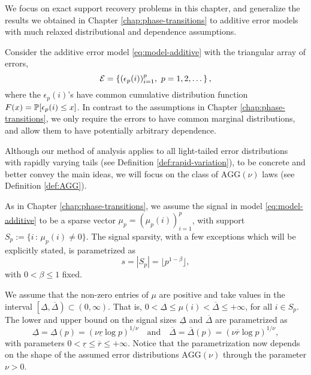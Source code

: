 
We focus on exact support recovery problems in this chapter, and generalize the results we obtained in Chapter \ref{chap:phase-transitions} to additive error models with much relaxed distributional and dependence assumptions.

Consider the additive error model \eqref{eq:model-additive} with the triangular array of errors,
\begin{equation} \label{eq:error-array}
    {\cal E} = \left\{ (\epsilon_p(i))_{i=1}^p,\ p=1,2,\dots\right\},
\end{equation}
where the $\epsilon_p(i)$'s have common cumulative distribution function $F(x)=\P[\epsilon_p(i)\le x]$.
In contrast to the assumptions in Chapter \ref{chap:phase-transitions}, we only require the errors to have common marginal distributions, and allow them to have potentially arbitrary dependence.

Although our method of analysis applies to all light-tailed error distributions with rapidly varying tails (see Definition \ref{def:rapid-variation}), to be concrete and better convey the main ideas, we will focus on the class of $\mathrm{AGG}(\nu)$ laws (see Definition \ref{def:AGG}).

As in Chapter \ref{chap:phase-transitions}, we assume the signal in model \eqref{eq:model-additive} to be a sparse vector $\mu_p = \left(\mu_p(i)\right)_{i=1}^p$, with support
$
S_p:= \{ i\, :\, \mu_p(i)\not = 0\}.
$ 
The signal sparsity, with a few exceptions which will be explicitly stated, is parametrized as
\begin{equation} \label{eq:sparsity-parametrized}
    s = |S_p| = \lfloor p^{1 -\beta} \rfloor, %
\end{equation}
with $0 < \beta \le 1$ fixed.

We assume that the non-zero entries of $\mu$ are positive and take values in the interval $\left[\underline{\Delta},\overline{\Delta}\right)\subset (0,\infty)$.
That is, $0<\underline{\Delta}\le\mu(i)<\overline{\Delta}\le+\infty$, for all $i\in S_p$.
The lower and upper bound on the signal sizes $\underline{\Delta}$ and $\overline{\Delta}$ are parametrized as
\begin{equation} \label{eq:signal-size-parametrized}
    \underline{\Delta} = \underline{\Delta}(p) = (\nu \underline{r} \log{p})^{1/\nu} \quad \text{and} \quad
    \overline{\Delta} = \overline{\Delta}(p)  = (\nu \overline{r} \log{p})^{1/\nu},
\end{equation}
with parameters $0 < \underline{r} \le \overline{r} \le +\infty$.
Notice that the parametrization now depends on the shape of the assumed error distributions $\mathrm{AGG}(\nu)$ through the parameter $\nu>0$.

